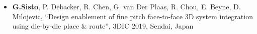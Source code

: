 \documentclass[10pt,a4paper]{altacv}
\begin{document}
\begin{fullwidth}
\begin{itemize}
    \setlength{\itemindent}{0.5em}
    \item \small{\textbf{G.Sisto}, P. Debacker, R. Chen, G. van Der Plaas, R. Chou, E. Beyne, D. Milojevic, “Design enablement of fine pitch face-to-face 3D system integration using die-by-die place \& route”, 3DIC 2019, Sendai, Japan}
\end{itemize}
\end{fullwidth}
\end{document}
